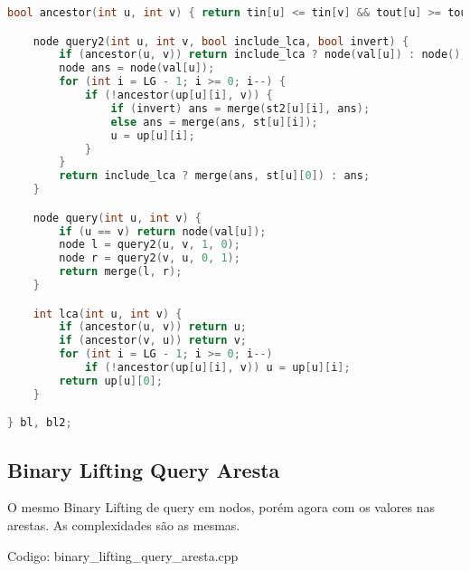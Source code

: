 \documentclass[10pt, a4paper, oneside]{book}
\begin{document}
\begin{lstlisting}[language=C++]
    bool ancestor(int u, int v) { return tin[u] <= tin[v] && tout[u] >= tout[v]; }

    node query2(int u, int v, bool include_lca, bool invert) {
        if (ancestor(u, v)) return include_lca ? node(val[u]) : node();
        node ans = node(val[u]);
        for (int i = LG - 1; i >= 0; i--) {
            if (!ancestor(up[u][i], v)) {
                if (invert) ans = merge(st2[u][i], ans);
                else ans = merge(ans, st[u][i]);
                u = up[u][i];
            }
        }
        return include_lca ? merge(ans, st[u][0]) : ans;
    }

    node query(int u, int v) {
        if (u == v) return node(val[u]);
        node l = query2(u, v, 1, 0);
        node r = query2(v, u, 0, 1);
        return merge(l, r);
    }

    int lca(int u, int v) {
        if (ancestor(u, v)) return u;
        if (ancestor(v, u)) return v;
        for (int i = LG - 1; i >= 0; i--)
            if (!ancestor(up[u][i], v)) u = up[u][i];
        return up[u][0];
    }

} bl, bl2;
\end{lstlisting}
\hfill

\subsection{Binary Lifting Query Aresta}


O mesmo Binary Lifting de query em nodos, porém agora com os valores nas arestas. As complexidades são as mesmas.

\hfill

Codigo: binary\_lifting\_query\_aresta.cpp
\end{document}
